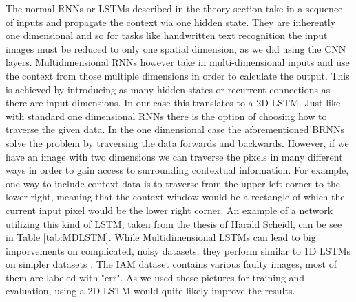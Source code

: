 \documentclass{article}
\begin{document}
The normal RNNs or LSTMs described in the theory section take in a sequence of inputs and propagate the context via one hidden state. They are inherently one dimensional and so for tasks like handwritten text recognition the input images must be reduced to only one spatial dimension, as we did using the CNN layers. Multidimensional RNNs however take in multi-dimensional inputs and use the context from those multiple dimensions in order to calculate the output\cite{Graves}. This is achieved by introducing as many hidden states or recurrent connections as there are input dimensions. In our case this translates to a 2D-LSTM. Just like with standard one dimensional RNNs there is the option of choosing how to traverse the given data. In the one dimensional case the aforementioned BRNNs solve the problem by traversing the data forwards and backwards. However, if we have an image with two dimensions we can traverse the pixels in many different ways in order to gain access to surrounding contextual information. For example, one way to include context data is to traverse from the upper left corner to the lower right, meaning that the context window would be a rectangle of which the current input pixel would be the lower right corner. An example of a network utilizing this kind of LSTM, taken from the thesis of Harald Scheidl\cite{ScheidlThesis}, can be see in Table \ref{tab:MDLSTM}. While Multidimensional LSTMs can lead to big imporvements on complicated, noisy datasets, they perform similar to 1D LSTMs on simpler datasets  \cite{Moysset}. The IAM dataset contains various faulty images, most of them are labeled with "err". As we used these pictures for training and evaluation, using a 2D-LSTM would quite likely improve the results.
\end{document}
